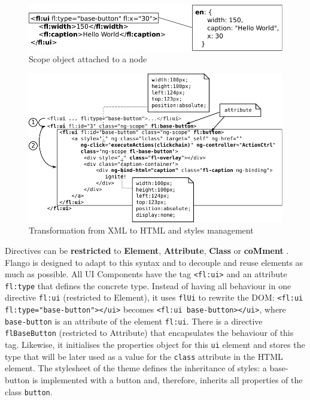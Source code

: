\begin{figure}[h]
    \centering
    \includegraphics{figures/design/properties-management.pdf}
    \caption{Scope object attached to a node}
    \label{fig:design-properties-management}
\end{figure}




\begin{figure}
    \centering
    \includegraphics{figures/design/from-xml-to-html-3.pdf}
    \caption{Transformation from XML to HTML and styles management}
    \label{fig:design-xml-to-html-3}
\end{figure}


Directives can be \textbf{restricted} to \textbf{Element}, \textbf{Attribute}, \textbf{Class} or \textbf{coMment} .
Flango \cm is designed to adapt to this syntax and to decouple and reuse elements as much as possible.
All UI Components have the tag \lstinline$<fl:ui>$ and an attribute \lstinline$fl:type$ that defines the concrete type.
Instead of having all behaviour in one directive \texttt{fl:ui} (restricted to Element), it uses \texttt{flUi} to rewrite the \ac{DOM}: \lstinline$<fl:ui fl:type="base-button"></ui>$ becomes \lstinline$<fl:ui base-button></ui>$, where \texttt{base-button} is an attribute of the element \texttt{fl:ui}.
There is a directive \texttt{flBaseButton} (restricted to Attribute) that encapsulates the behaviour of this tag.
Likewise, it initialises the properties object for this \texttt{ui} element and stores the type that will be later used as a value for the \texttt{class} attribute in the \ac{HTML} element.
The stylesheet of the theme defines the inheritance of styles: a base-button is implemented with a button and, therefore, inherits all properties of the class \texttt{button}.

